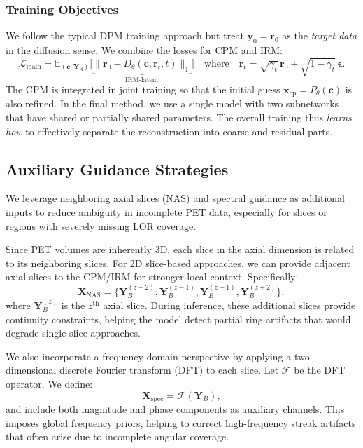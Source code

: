 \documentclass[
reprint,
superscriptaddress,
nofootinbib,
amsmath,amssymb,
aps,
prd,
]{revtex4-2}
\begin{document}
\subsubsection{Training Objectives}
We follow the typical DPM training approach but treat \(\mathbf{y}_0=\mathbf{r}_0\) as the \emph{target data} in the diffusion sense. We combine the losses for CPM and IRM:
\begin{equation}
\mathcal{L}_{\text{main}} = \mathbb{E}_{(\mathbf{c},\mathbf{Y}_A)}\Big[
\underbrace{\|\mathbf{r}_0 - D_\theta(\mathbf{c},\mathbf{r}_t,t)\|_1}_{\text{IRM-latent}}\Big] 
\quad \text{where} \quad \mathbf{r}_t=\sqrt{\gamma_t}\,\mathbf{r}_0 + \sqrt{1-\gamma_t}\,\boldsymbol{\epsilon}.
\end{equation}
The CPM is integrated in joint training so that the initial guess \(\mathbf{x}_\text{cp}=P_\theta(\mathbf{c})\) is also refined. In the final method, we use a single model with two subnetworks that have shared or partially shared parameters. The overall training thus \emph{learns how} to effectively separate the reconstruction into coarse and residual parts.

\subsection{Auxiliary Guidance Strategies}
\label{sec:aux_guidance}
We leverage neighboring axial slices (NAS) and spectral guidance as additional inputs to reduce ambiguity in incomplete PET data, especially for slices or regions with severely missing LOR coverage.

Since PET volumes are inherently 3D, each slice in the axial dimension is related to its neighboring slices. For 2D slice-based approaches, we can provide adjacent axial slices to the CPM/IRM for stronger local context. Specifically:
\begin{equation}
\mathbf{X}_{\text{NAS}} = \{\mathbf{Y}_B^{(z-2)}, \mathbf{Y}_B^{(z-1)}, \mathbf{Y}_B^{(z+1)}, \mathbf{Y}_B^{(z+2)}\},
\end{equation}
where \(\mathbf{Y}_B^{(z)}\) is the \(z^\text{th}\) axial slice. During inference, these additional slices provide continuity constraints, helping the model detect partial ring artifacts that would degrade single-slice approaches.

We also incorporate a frequency domain perspective by applying a two-dimensional discrete Fourier transform (DFT) to each slice. Let \(\mathcal{F}\) be the DFT operator. We define:
\begin{equation}
\mathbf{X}_{\text{spec}} = \mathcal{F}(\mathbf{Y}_B),
\end{equation}
and include both magnitude and phase components as auxiliary channels. This imposes global frequency priors, helping to correct high-frequency streak artifacts that often arise due to incomplete angular coverage.
\end{document}
